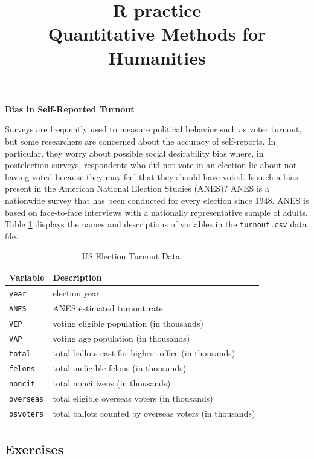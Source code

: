 \documentclass[12pt]{article}
\author{\empty}
\title{R practice \\ Quantitative Methods for Humanities}
\date{\empty}
\begin{document}
\maketitle

\begin{center}
    \textbf{Bias in Self-Reported Turnout}    
\end{center}

Surveys are frequently used to measure political behavior such as voter turnout, but some researchers are concerned about the accuracy of self-reports. In particular, they worry about possible social desirability bias where, in postelection surveys, respondents who did not vote in an election lie about not having voted because they may feel that they should have voted. Is such a bias present in the American National Election Studies (ANES)? ANES is a nationwide survey that has been conducted for every election since 1948. ANES is based on face-to-face interviews with a nationally representative sample of adults. Table \ref{table:US_election} displays the names and descriptions of variables in the \texttt{turnout.csv} data file.

\begin{table}[h!]
\centering
\caption{US Election Turnout Data.}
\label{table:US_election}
\begin{tabular}{ll}
\hline
\textbf{Variable} & \textbf{Description} \\ \hline
\texttt{year} & election year \\
\texttt{ANES} & ANES estimated turnout rate \\
\texttt{VEP} & voting eligible population (in thousands) \\
\texttt{VAP} & voting age population (in thousands) \\
\texttt{total} & total ballots cast for highest office (in thousands) \\
\texttt{felons} & total ineligible felons (in thousands) \\
\texttt{noncit} & total noncitizens (in thousands) \\
\texttt{overseas} & total eligible overseas voters (in thousands) \\
\texttt{osvoters} & total ballots counted by overseas voters (in thousands) \\ \hline
\end{tabular}
\end{table}

\subsection*{Exercises}
\end{document}
